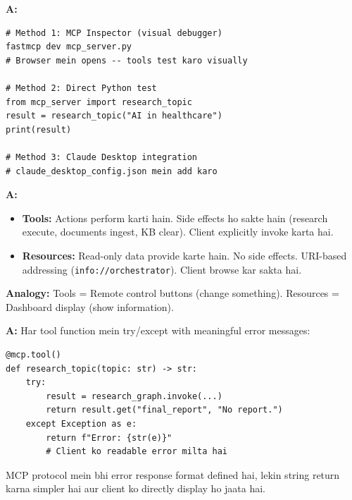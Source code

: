 \documentclass[12pt, a4paper]{article}
\begin{document}
\begin{interviewbox}[title={\faIcon{user-tie} ~Q34: MCP server test kaise karo?}]
\textbf{A:}
\begin{lstlisting}[style=bashstyle]
# Method 1: MCP Inspector (visual debugger)
fastmcp dev mcp_server.py
# Browser mein opens -- tools test karo visually

# Method 2: Direct Python test
from mcp_server import research_topic
result = research_topic("AI in healthcare")
print(result)

# Method 3: Claude Desktop integration
# claude_desktop_config.json mein add karo
\end{lstlisting}
\end{interviewbox}

\begin{interviewbox}[title={\faIcon{user-tie} ~Q35: MCP resources vs tools mein kya fark hai?}]
\textbf{A:}
\begin{itemize}
\item \textbf{Tools:} Actions perform karti hain. Side effects ho sakte hain (research execute, documents ingest, KB clear). Client explicitly invoke karta hai.
\item \textbf{Resources:} Read-only data provide karte hain. No side effects. URI-based addressing (\texttt{info://orchestrator}). Client browse kar sakta hai.
\end{itemize}

\textbf{Analogy:} Tools = Remote control buttons (change something). Resources = Dashboard display (show information).
\end{interviewbox}

\begin{interviewbox}[title={\faIcon{user-tie} ~Q36: MCP server mein error handling kaise karo?}]
\textbf{A:} Har tool function mein try/except with meaningful error messages:
\begin{lstlisting}[style=pythonstyle]
@mcp.tool()
def research_topic(topic: str) -> str:
    try:
        result = research_graph.invoke(...)
        return result.get("final_report", "No report.")
    except Exception as e:
        return f"Error: {str(e)}"
        # Client ko readable error milta hai
\end{lstlisting}

MCP protocol mein bhi error response format defined hai, lekin string return karna simpler hai aur client ko directly display ho jaata hai.
\end{interviewbox}
\end{document}
